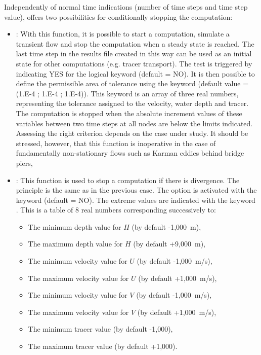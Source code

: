 Independently of normal time indications (number of time steps and time step
value),  offers two possibilities for conditionally stopping the
computation:

\begin{itemize}
\item {}:
With this function, it is possible to start a computation, simulate a transient
flow and stop the computation when a steady state is reached.
The last time step in the results file created in this way can be used as an
initial state for other computations (e.g. tracer transport).
The test is triggered by indicating YES for the logical keyword
 (default = NO).
It is then possible to define the permissible area of tolerance
using the keyword 
(default value = (1.E-4 ; 1.E-4 ; 1.E-4)).
This keyword is an array of three real numbers, representing the tolerance
assigned to the velocity, water depth and tracer.
The computation is stopped when the absolute increment values of these variables
between two time steps at all nodes are below the limits indicated.
Assessing the right criterion depends on the case under study.
It should be stressed, however, that this function is inoperative
in the case of fundamentally non-stationary flows
such as Karman eddies behind bridge piers,

\item {}:
This function is used to stop a computation if there is divergence.
The principle is the same as in the previous case.
The option is activated with the keyword 
(default = NO).
The extreme values are indicated with the keyword .
This is a table of 8 real numbers corresponding successively to:
\begin{itemize}
\item The minimum depth value for $H$ (by default -1,000~m),

\item The maximum depth value for $H$ (by default +9,000~m),

\item The minimum velocity value for $U$ (by default -1,000~m/s),

\item The maximum velocity value for $U$ (by default +1,000~m/s),

\item The minimum velocity value for $V$ (by default -1,000~m/s),

\item The maximum velocity value for $V$ (by default +1,000~m/s),

\item The minimum tracer value (by default -1,000),

\item The maximum tracer value (by default +1,000).
\end{itemize}
\end{itemize}

